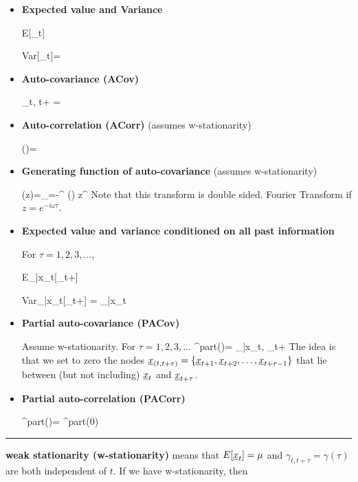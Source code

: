 \begin{itemize}

\item {\bf Expected value and Variance}

\beq
E[\rvx_t]
\eeq

\beq
Var[\rvx_t]=
\eeq

\item{\bf Auto-covariance (ACov)}

\beq
\gamma_{t, t+\tau}
=
\eeq




\item{\bf Auto-correlation (ACorr)} (assumes
w-stationarity)

\beq
\rho(\tau)=
\eeq

\item {\bf Generating function
of auto-covariance} (assumes w-stationarity)


\beq
\TIL{\gamma}(z)=\sum_{\tau=-\infty}^{\infty}
\gamma(\tau) z^\tau
\eeq
Note that this transform is double sided.
Fourier Transform
if $z=e^{-i\omega\tau}$.

\item{\bf Expected value
and variance conditioned on all past information}

For $\tau=1,2, 3, \dots$,

\beq
E_{|x_{\leq t}}[\rvx_{t+\tau}]
\eeq

\beq
Var_{|x_{\leq t}}[\rvx_{t+\tau}]
=
_{|x_{\leq t}}
\eeq

\item {\bf Partial auto-covariance (PACov)}

Assume w-stationarity.
For $\tau=1,2,3, \ldots$
\beq
\gamma^{part}(\tau)=
_{|x_{\leq t}, \rvx_{t+\tau}}
\eeq
The idea is that we set to zero the
nodes $\rvx_{(t, t+\tau)}=
\{\rvx_{t+1}, \rvx_{t+2}, \ldots,\rvx_{t+\tau-1}\}$
that lie
between
(but not including) $\rvx_t$ and $\rvx_{t+\tau}$.

\item {\bf Partial auto-correlation (PACorr)}


\beq
\rho^{part}(\tau)=
{\gamma^{part}(0)}
\eeq
\end{itemize}


\hrule

{\bf weak stationarity (w-stationarity)}
means that
$E[\rvx_t]=\mu$
and
$\gamma_{t, t+\tau}=\gamma(\tau)$
are both independent of $t$.
If we have w-stationarity,
then

